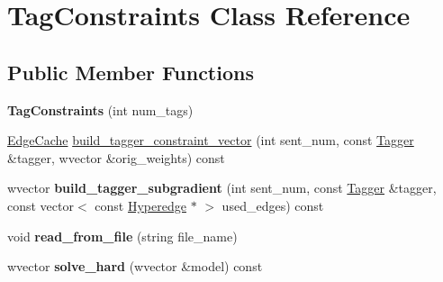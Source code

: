 \hypertarget{classTagConstraints}{
\section{TagConstraints Class Reference}
\label{classTagConstraints}
}
\subsection*{Public Member Functions}
\begin{DoxyCompactItemize}
\item 
\hypertarget{classTagConstraints_a58a2e5245400d411de24e36534d11945}{
{\bfseries TagConstraints} (int num\_\-tags)}
\label{classTagConstraints_a58a2e5245400d411de24e36534d11945}

\item 
\hyperlink{classCache}{EdgeCache} \hyperlink{classTagConstraints_adec1a1de8fb49e79b52c4c93517414a0}{build\_\-tagger\_\-constraint\_\-vector} (int sent\_\-num, const \hyperlink{classTagger}{Tagger} \&tagger, wvector \&orig\_\-weights) const 
\item 
\hypertarget{classTagConstraints_acec3818d7505e9147828ab7cb3863001}{
wvector {\bfseries build\_\-tagger\_\-subgradient} (int sent\_\-num, const \hyperlink{classTagger}{Tagger} \&tagger, const vector$<$ const \hyperlink{classScarab_1_1HG_1_1Hyperedge}{Hyperedge} $\ast$ $>$ used\_\-edges) const }
\label{classTagConstraints_acec3818d7505e9147828ab7cb3863001}

\item 
\hypertarget{classTagConstraints_a8b8df130795f2fbc1ce2aac375dfc00a}{
void {\bfseries read\_\-from\_\-file} (string file\_\-name)}
\label{classTagConstraints_a8b8df130795f2fbc1ce2aac375dfc00a}

\item 
\hypertarget{classTagConstraints_a3e490a8d4d335ed4d04803fab0a82871}{
wvector {\bfseries solve\_\-hard} (wvector \&model) const }
\label{classTagConstraints_a3e490a8d4d335ed4d04803fab0a82871}

\end{DoxyCompactItemize}
